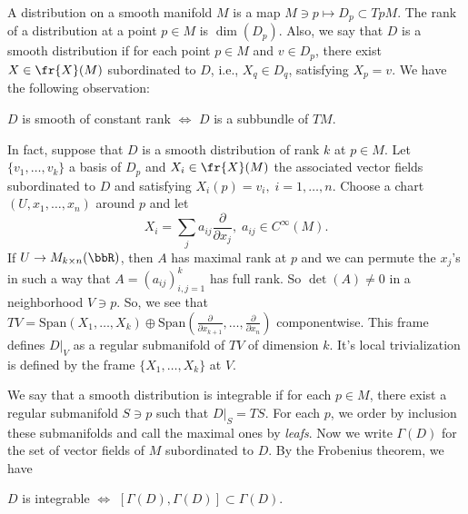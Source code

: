 A distribution on a smooth manifold $M$ is a map $M\ni p\mapsto D_p\subset TpM$. The rank of a distribution 
at a point $p\in M$ is $\dim(D_p)$. Also, we say that $D$ is a smooth distribution if for each point $p\in M$ and 
$v\in D_p$, there exist $X\in\fr{X}(M)$ subordinated to $D$, i.e., $X_q\in D_q$, satisfying $X_p=v$. We have 
the following observation:
\begin{center}
    $D$ is smooth of constant rank $\iff$ $D$ is a subbundle of $TM$.
\end{center}
In fact, suppose that $D$ is a smooth distribution of rank $k$ at $p\in M$. Let $\{v_1,\dots, v_k\}$ a basis 
of $D_p$ and $X_i\in\fr{X}(M)$ the associated vector fields subordinated to $D$ and satisfying $X_i(p)=v_i,\;i=1,\dots,n$. 
Choose a chart $(U,x_1,\dots, x_n)$ around $p$ and let 
\begin{equation}
    X_i=\sum_j a_{ij}\frac{\partial}{\partial x_j},\; a_{ij}\in C^\infty(M).
\end{equation} 
If $U\to  M_{k\times n}(\bbR)$, then $A$ has maximal rank at $p$ and we can permute the $x_j$'s in such a way 
that $A=(a_{ij})_{i,j=1}^k$ has full rank. So $\det(A)\neq0$ in a neighborhood $V\ni p$. So, we see that 
$TV=\text{Span}(X_1,\dots,X_k)\oplus \text{Span}(\tfrac{\partial}{\partial x_{k+1}},\dots,\tfrac{\partial}{\partial x_n})$ 
componentwise. This frame defines $D|_V$ as a regular submanifold of $TV$ of dimension $k$. It's local trivialization is 
defined by the frame $\{X_1,\dots, X_k\}$ at $V$.\par 

We say that a smooth distribution is integrable if for each $p\in M$, there exist a regular submanifold $S\ni p$ such that 
$D|_S=TS$. For each $p$, we order by inclusion these submanifolds and call the maximal ones by \textit{leafs}.
Now we write $\Gamma(D)$ for the set of vector fields of $M$ subordinated to $D$. By the Frobenius theorem, we have
\begin{center}
    $D$ is integrable $\iff$ $[\Gamma(D),\Gamma(D)]\subset \Gamma(D)$.
\end{center} 

